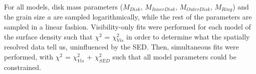 For all models, disk mass parameters ($M_{Disk}$, $M_{Inner Disk}$, $M_{Outer Disk}$, $M_{Ring}$) and the grain size $a$ are sampled logarithmically, while the rest of the parameters are sampled in a linear fashion.  Visibility-only fits were performed for each model of the surface density such that $\chi^{2}$ = $\chi^{2}_{Vis}$ in order to determine what the spatially resolved data tell us, uninfluenced by the SED. Then, simultaneous fits were performed, with $\chi^{2}$ = $\chi^{2}_{Vis}$ + $\chi^{2}_{SED}$ such that all model parameters could be constrained.



